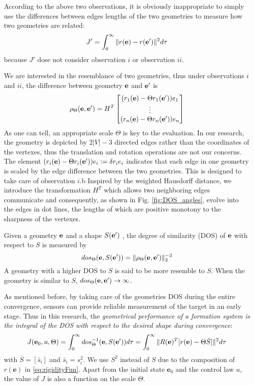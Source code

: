 \documentclass[times]{rncauth}
\newcommand{\be}{\ensuremath \mathbf{e}}
\begin{document}
According to the above two observations, it is obviously inappropriate to simply use the differences between edges lengths of the two geometries to measure how two geometries are related:
\begin{equation}
J'=\int_0^\infty \|r(\mathbf{e})-r(\be')\|^2 d\tau
\end{equation}
because $J'$ dose not consider observation $i$ or observation $ii$.

We are interested in the resemblance of two geometries, thus under observations $i$ and $ii$, the difference between geometry $\be$ and $\be'$ is
$$\rho_\Theta(\be,\be')=H^T\begin{bmatrix}(r_1(\be) -  \Theta r_1(\be')) e_1\\ \vdots \\ (r_n(\be)- \Theta r_n(\be')) e_n\end{bmatrix}$$
As one can tell, an appropriate scale $\Theta$ is key to the evaluation. In our research, the geometry is depicted by $2|V|-3$ directed edges
rather than the coordinates of the vertexes, thus the translation
and rotation operations are not our concerns.
 The element $(r_i(\be) -  \Theta r_i(\be')) e_i:=\delta r_i e_i$ indicates that
 each edge in one geometry is scaled by the edge difference between the two geometries.
 This is designed to take care of observation $i$.b
Inspired by the weighted Hausdorff distance, we introduce the transformation $H^T$ which allows two neighboring edges communicate and  consequently, as shown in Fig. \ref{fig:DOS_angles}, evolve into the edges in dot lines, the lengths of which are positive monotony to the sharpness of the vertexes.


Given a geometry  $\be$  and a shape $S(\be')$ , the degree of similarity (DOS) of $\be$ with respect to $S$ is measured by
\begin{equation}\label{eq:distance}
dos_\Theta(\be,S(\be'))=\|\rho_\Theta(\be, \be')\|_2^{-2}
\end{equation}
A geometry with a higher DOS to $S$ is said to be more resemble to $S$. When the geometry is similar to $S$, $dos_\Theta(\be,\be')\rightarrow \infty$.

As mentioned before, by taking care of the geometries DOS during the entire convergence, sensors can provide reliable measurement of the target in an early stage.  Thus in this research, the \emph{geometrical performance of a formation system is the integral of the DOS with respect to the desired shape during convergence}:
\begin{equation}\label{eq:myJ0}
  J(\mathbf{e}_0,u,\Theta)=\int^\infty_0 dos^{-1}_\Theta(\be,S(\be'))d\tau=\int^\infty_0 \|R(\mathbf{e})^T[r(\mathbf{e})-\Theta\bar{S}]\|^2 d\tau
\end{equation}
with $\bar{S}=[\bar{s}_i]$ and $\bar{s}_i=s_i^2$. We use $S^2$
instead of $S$ due to the composition of $r(\mathbf{e})$ in
\eqref{eq:rigidityFun}. Apart from the initial state $\mathbf{e}_0$
and the control law $u$, the value of $J$ is also a function on the scale $\Theta$.
\end{document}
